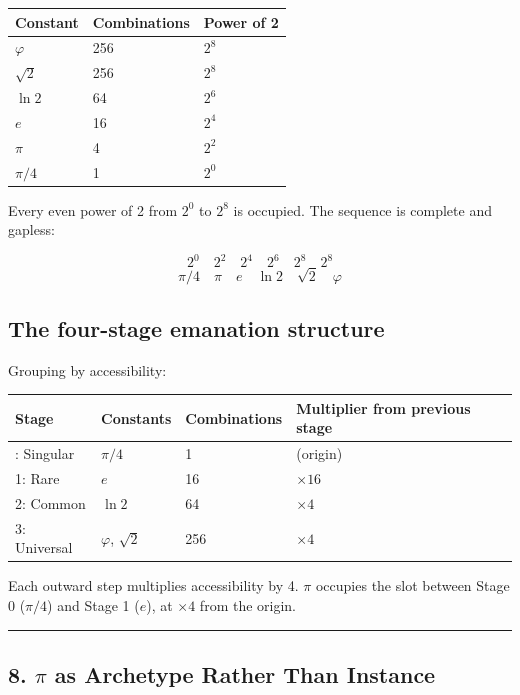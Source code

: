\documentclass[12pt]{article}
\begin{document}
\begin{longtable}[]{@{}lll@{}}
\toprule\noalign{}
Constant & Combinations & Power of 2 \\
\midrule\noalign{}
\endhead
\bottomrule\noalign{}
\endlastfoot
\(\varphi\) & 256 & \(2^8\) \\
\(\sqrt{2}\) & 256 & \(2^8\) \\
\(\ln 2\) & 64 & \(2^6\) \\
\(e\) & 16 & \(2^4\) \\
\(\pi\) & 4 & \(2^2\) \\
\(\pi/4\) & 1 & \(2^0\) \\
\end{longtable}

Every even power of 2 from \(2^0\) to \(2^8\) is occupied. The sequence
is complete and gapless:

\[
2^0 \quad 2^2 \quad 2^4 \quad 2^6 \quad 2^8 \quad 2^8
\] \[
\pi/4 \quad \pi \quad e \quad \ln 2 \quad \sqrt{2} \quad \varphi
\]

\subsection{The four-stage emanation structure}\label{the-four-stage-emanation-structure}

Grouping by accessibility:

\begin{longtable}[]{@{}llll@{}}
\toprule\noalign{}
Stage & Constants & Combinations & Multiplier from previous stage \\
\midrule\noalign{}
\endhead
\bottomrule\noalign{}
\endlastfoot
0: Singular & \(\pi/4\) & 1 & (origin) \\
1: Rare & \(e\) & 16 & \(\times 16\) \\
2: Common & \(\ln 2\) & 64 & \(\times 4\) \\
3: Universal & \(\varphi\), \(\sqrt{2}\) & 256 & \(\times 4\) \\
\end{longtable}

Each outward step multiplies accessibility by 4. \(\pi\) occupies the
slot between Stage 0 (\(\pi/4\)) and Stage 1 (\(e\)), at \(\times 4\)
from the origin.

\begin{center}\rule{0.5\linewidth}{0.5pt}\end{center}

\subsection{\texorpdfstring{8. \(\pi\) as Archetype Rather Than
Instance}{8. \textbackslash pi as Archetype Rather Than Instance}}\label{pi-as-archetype-rather-than-instance}
\end{document}

